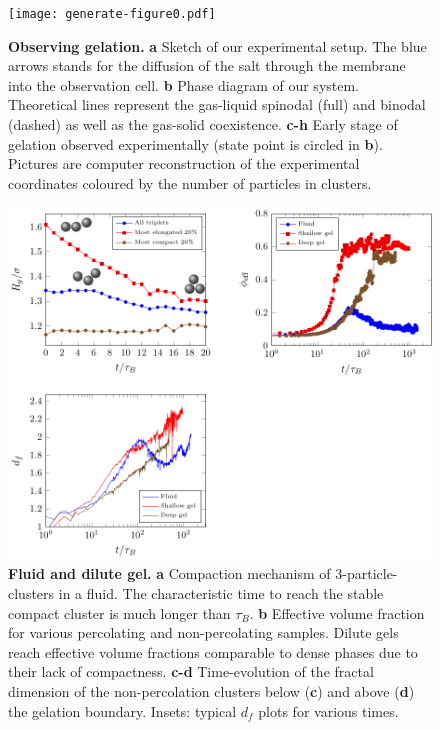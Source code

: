 


\clearpage
\begin{figure}
	\begin{center}
	\texttt{[image: generate-figure0.pdf]}
	\end{center}
	\caption{\textbf{Observing gelation.} \textbf{a} Sketch of our experimental setup. The blue arrows stands for the diffusion of the salt through the membrane into the observation cell. \textbf{b} Phase diagram of our system. Theoretical lines represent the gas-liquid spinodal (full) and binodal (dashed) as well as the gas-solid coexistence. \textbf{c-h} Early stage of gelation observed experimentally (state point is circled in \textbf{b}). Pictures are computer reconstruction of the experimental coordinates coloured by the number of particles in clusters.}
	\label{fig:methods}
\end{figure}

\clearpage
\begin{figure}
	\begin{center}
	\includegraphics{generate-figure1.pdf}
	\end{center}
	\caption{\textbf{Fluid and dilute gel.} \textbf{a} Compaction mechanism of 3-particle-clusters in a fluid. The characteristic time to reach the stable compact cluster is much longer than $\tau_B$. \textbf{b} Effective volume fraction for various percolating and non-percolating samples. Dilute gels reach effective volume fractions comparable to dense phases due to their lack of compactness. \textbf{c-d} Time-evolution of the fractal dimension of the non-percolation clusters below (\textbf{c}) and above (\textbf{d}) the gelation boundary. Insets: typical $d_f$ plots for various times.}
	\label{fig:fluid_dilute}
\end{figure}

